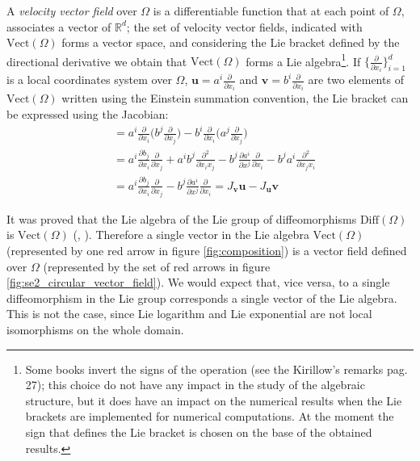 A \emph{velocity vector field} over $\Omega$ is a differentiable function that at each point of $\Omega$, associates a vector of $\mathbb{R}^d$; the set of velocity vector fields, indicated with $\text{Vect}(\Omega)$ forms a vector space, and considering the Lie bracket defined by the directional derivative
we obtain that $\text{Vect}(\Omega)$ forms a Lie algebra\footnote{
	Some books invert the signs of the operation (see the Kirillow's remarks \cite{kirillov2008introduction} pag. 27); this choice do not have any impact in the study of the algebraic structure, but it does have an impact on the numerical results when the Lie brackets are implemented for numerical computations. At the moment the sign that defines the Lie bracket is chosen on the base of the obtained results.
}.
If $\{\frac{\partial}{\partial x_{i}}\}_{i=1}^{d}$ is a local coordinates system over $\Omega$, $\mathbf{u}=a^{i} \frac{\partial}{\partial x_{i}}$ and $\mathbf{v}=b^{i} \frac{\partial}{\partial x_{i}}$ are two elements of  $\text{Vect}(\Omega)$ written using the Einstein summation convention, the Lie bracket can be expressed using the Jacobian:
\begin{align*}
[\mathbf{u}, \mathbf{v}] &= 
a^{i} \frac{\partial}{\partial x_{i}}\big( b^{j} \frac{\partial}{\partial x_{j}} \big)
-
b^{i} \frac{\partial}{\partial x_{i}}\big( a^{j} \frac{\partial}{\partial x_{j}} \big) \\
&=
a^{i} \frac{\partial b_{j}}{\partial x_{i}}\frac{\partial}{\partial x_{j}}  
+ 
a^{i}b^{j}\frac{\partial^{2}}{\partial x_{i}x_{j}}
- 
b^{j} \frac{\partial a^{i}}{\partial x^{j}}\frac{\partial}{\partial x_{i}} 
-
b^{j}a^{i}\frac{\partial^{2}}{\partial x_{j}x_{i}} \\
&=
a^{i} \frac{\partial b_{j}}{\partial x_{i}}\frac{\partial}{\partial x_{j}}
-
b^{j} \frac{\partial a^{i}}{\partial x^{j}}\frac{\partial}{\partial x_{i}} 
= J_{\mathbf{v}}\mathbf{u} - J_{\mathbf{u}}\mathbf{v}
\end{align*}

It was proved that the Lie algebra of the Lie group of diffeomorphisms $\text{Diff}(\Omega)$ is $\text{Vect}(\Omega)$ (\cite{milnor1982infinite}, \cite{ovsienko1992integrals}). 
Therefore a single vector in the Lie algebra $\text{Vect}(\Omega)$ (represented by one red arrow in figure \ref{fig:composition}) is a vector field defined over $\Omega$ (represented by the set of red arrows in figure \ref{fig:se2_circular_vector_field}). We would expect that, vice versa, to a single diffeomorphism in the Lie group corresponds a single vector of the Lie algebra. This is not the case, since Lie logarithm and Lie exponential are not local isomorphisms on the whole domain.

